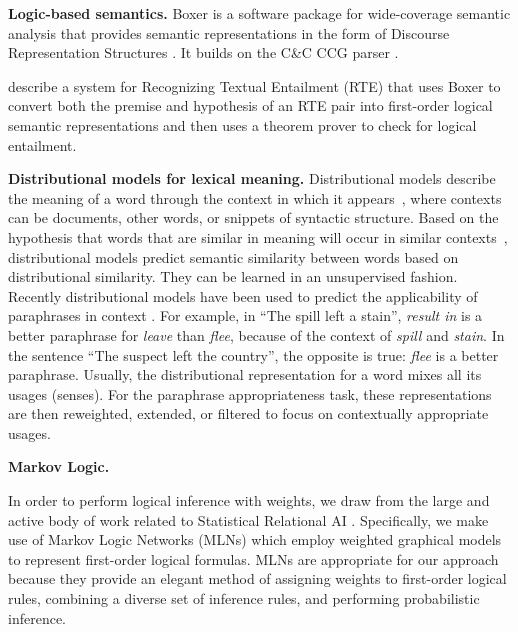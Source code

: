 \vspace{2mm}
\textbf{Logic-based semantics.}
Boxer \citep{bos:coling2004} is a software package for wide-coverage semantic
analysis that provides semantic representations in the form of Discourse
Representation Structures \citep{kamp:book93}. It builds on the C\&C CCG parser
\citep{clark:acl04}.

\citet{bos:emnlp2005} describe a system for Recognizing Textual Entailment
(RTE) that uses Boxer to convert both the premise and hypothesis of an RTE pair
into first-order logical semantic representations and then uses a theorem prover
to check for logical entailment. 


\vspace{2mm}
\noindent\textbf{Distributional models for lexical meaning.} 
 Distributional
models describe the meaning of a word through the context in which it
appears~\citep{landauer97:solution,lund96:producing}, where contexts can be
documents, other words, or snippets of syntactic structure. Based on
the hypothesis that words that are similar in meaning will occur in
similar contexts~\citep{harris:wj1954,firth:slaj1957}, distributional
models predict semantic similarity between words based on
distributional similarity. They can be learned in an unsupervised fashion.
Recently distributional models have been used to predict the applicability of
paraphrases in context \citep{erk:emnlp2008,thater:acl2010,reisinger:naacl2010,dinu:emnlp2010,vandecruys:emnlp2011}.
For example, in ``The spill left a stain'', {\it result in} is a better
paraphrase for {\it leave} than {\it flee}, because of the context of {\it spill}
and {\it stain}.  In the sentence ``The suspect left the country'', the
opposite is true: {\it flee} is a better paraphrase. Usually, the distributional
representation for a word mixes all its usages (senses). For the paraphrase
appropriateness task, these representations are then reweighted, extended, or
filtered to focus on contextually appropriate usages.


\vspace{2mm}
\noindent\textbf{Markov Logic.} 

In order to perform logical inference with weights, we draw
from the large and active body of work related to Statistical Relational AI
\citep{getoor:book2007}.  Specifically, we make use of Markov Logic Networks
(MLNs) \citep{richardson:mlj06} which employ weighted graphical models to
represent first-order logical formulas. MLNs are appropriate for our approach
because they provide an elegant method of assigning weights to first-order
logical rules, combining a diverse set of inference rules, and performing
probabilistic inference. 

